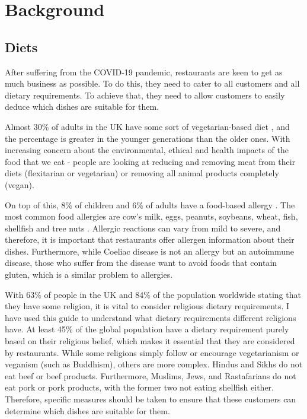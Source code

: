 \chapter{Background}

\section{Diets}

After suffering from the COVID-19 pandemic, restaurants are keen to get as much business as possible. To do this, they need to cater to all customers and all dietary requirements. To achieve that, they need to allow customers to easily deduce which dishes are suitable for them.

Almost 30\% of adults in the UK have some sort of vegetarian-based diet \cite{vege_2022}, and the percentage is greater in the younger generations than the older ones. With increasing concern about the environmental, ethical and health impacts of the food that we eat - people are looking at reducing and removing meat from their diets (flexitarian or vegetarian) or removing all animal products completely (vegan).

On top of this, 8\% of children and 6\% of adults have a food-based allergy \cite{sicherer_sampson_2017}. The most common food allergies are cow's milk, eggs, peanuts, soybeans, wheat, fish, shellfish and tree nuts \cite{allergies_west_2023}. Allergic reactions can vary from mild to severe, and therefore, it is important that restaurants offer allergen information about their dishes. Furthermore, while Coeliac disease is not an allergy but an autoimmune disease, those who suffer from the disease want to avoid foods that contain gluten, which is a similar problem to allergies.

With 63\% of people in the UK \cite{religion_ons_census_2021} and 84\% of the population worldwide \cite{hackett_grim_2012} stating that they have some religion, it is vital to consider religious dietary requirements. I have used this guide \cite{guidance_on_foods_for_religious_faiths_2009} to understand what dietary requirements different religions have. At least 45\% of the global population have a dietary requirement purely based on their religious belief, which makes it essential that they are considered by restaurants. While some religions simply follow or encourage vegetarianism or veganism (such as Buddhism), others are more complex. Hindus and Sikhs do not eat beef or beef products. Furthermore, Muslims, Jews, and Rastafarians do not eat pork or pork products, with the former two not eating shellfish either. Therefore, specific measures should be taken to ensure that these customers can determine which dishes are suitable for them.

